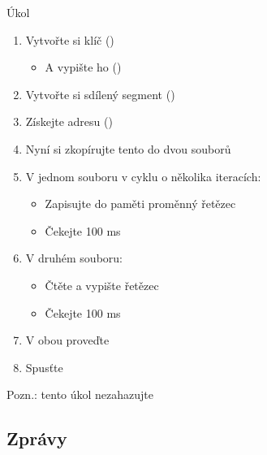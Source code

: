 \begin{frame}{Úkol}

  \begin{enumerate}
    \item Vytvořte si klíč ()
    \begin{itemize}
      \item A vypište ho ()
    \end{itemize}
    \item Vytvořte si sdílený segment ()
    \item Získejte adresu ()
    \item Nyní si zkopírujte tento  do dvou souborů
    \item V jednom souboru v cyklu o několika iteracích:
    \begin{itemize}
      \item Zapisujte do paměti proměnný řetězec
      \item Čekejte 100 ms
    \end{itemize}

    \item V druhém souboru:
    \begin{itemize}
      \item Čtěte a vypište řetězec
      \item Čekejte 100 ms
    \end{itemize}

    \item V obou proveďte 
    \item Spusťte
  \end{enumerate}

  Pozn.: tento úkol nezahazujte

\end{frame}

\iffimuni
\subsection{Zprávy}
\fi

